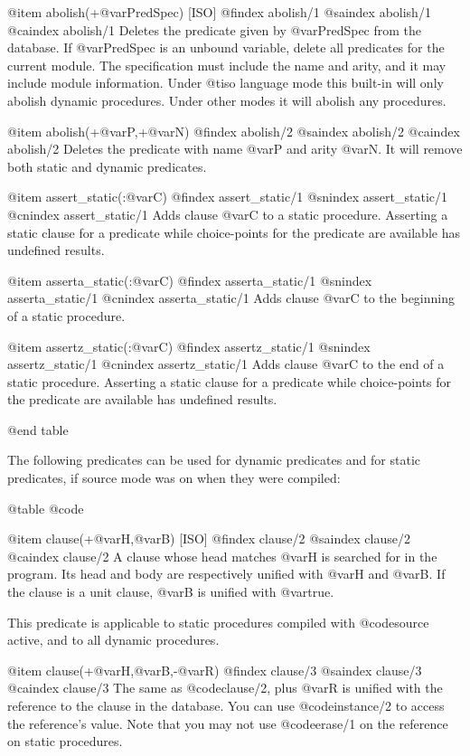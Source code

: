 {{{{{{@item abolish(+@var{PredSpec}) [ISO]
@findex abolish/1
@saindex abolish/1
@caindex abolish/1
   Deletes the predicate given by @var{PredSpec} from the database. If
@var{PredSpec} is an unbound variable, delete all predicates for the
current module. The
specification must include the name and arity, and it may include module
information. Under @t{iso} language mode this built-in will only abolish
dynamic procedures. Under other modes it will abolish any procedures. 

@item abolish(+@var{P},+@var{N})
@findex abolish/2
@saindex abolish/2
@caindex abolish/2
 Deletes the predicate with name @var{P} and arity @var{N}. It will remove
both static and dynamic predicates.

@item assert_static(:@var{C})
@findex assert_static/1
@snindex assert_static/1
@cnindex assert_static/1
Adds clause @var{C} to a static procedure. Asserting a static clause
for a predicate while choice-points for the predicate are available has
undefined results.

@item asserta_static(:@var{C})
@findex asserta_static/1
@snindex asserta_static/1
@cnindex asserta_static/1
 Adds clause @var{C} to the beginning of a static procedure. 

@item assertz_static(:@var{C})
@findex assertz_static/1
@snindex assertz_static/1
@cnindex assertz_static/1
 Adds clause @var{C} to the end of a static procedure.  Asserting a
static clause for a predicate while choice-points for the predicate are
available has undefined results.

@end table

The following predicates can be used for dynamic predicates and for
static predicates, if source mode was on when they were compiled:

@table @code

@item clause(+@var{H},@var{B}) [ISO]
@findex clause/2
@saindex clause/2
@caindex clause/2
  A clause whose head matches @var{H} is searched for in the
program. Its head and body are respectively unified with @var{H} and
@var{B}. If the clause is a unit clause, @var{B} is unified with
@var{true}.

This predicate is applicable to static procedures compiled with
@code{source} active, and to all dynamic procedures.

@item clause(+@var{H},@var{B},-@var{R})
@findex clause/3
@saindex clause/3
@caindex clause/3
The same as @code{clause/2}, plus @var{R} is unified with the
reference to the clause in the database. You can use @code{instance/2}
to access the reference's value. Note that you may not use
@code{erase/1} on the reference on static procedures.

}}}}}}
